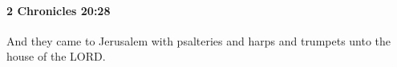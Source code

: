
		\paragraph{2 Chronicles 20:28} %
			\label{2CHRONICLES-20-28}

			And they came to Jerusalem with psalteries and harps and trumpets unto the house of the LORD.


